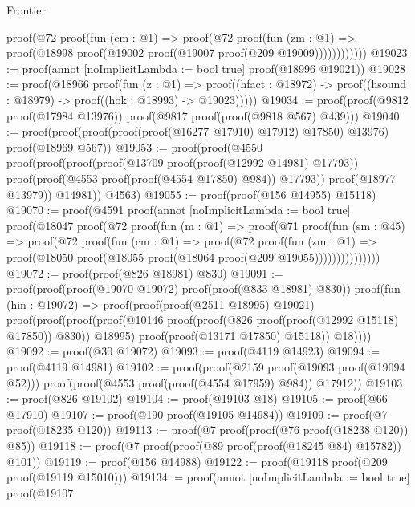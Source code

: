 \begin{lexlean}{Frontier}
\begin{coremodule}
              proof(@72
                  proof(fun (cm : @1) =>
                    proof(@72
                        proof(fun (zm : @1) =>
                          proof(@18998 proof(@19002 proof(@19007 proof(@209 @19009))))))))))))
@19023 := proof(annot [noImplicitLambda := bool true] proof(@18996 @19021))
@19028 := proof(@18966
      proof(fun (z : @1) =>
        proof((hfact : @18972) -> proof((hsound : @18979) -> proof((hok : @18993) -> @19023)))))
@19034 := proof(proof(@9812 proof(@17984 @13976)) proof(@9817 proof(proof(@9818 @567) @439)))
@19040 := proof(proof(proof(proof(proof(@16277 @17910) @17912) @17850) @13976) proof(@18969 @567))
@19053 := proof(proof(@4550
        proof(proof(proof(proof(@13709 proof(proof(@12992 @14981) @17793))
                proof(proof(@4553 proof(proof(@4554 @17850) @984)) @17793))
              proof(@18977 @13979))
            @14981))
      @4563)
@19055 := proof(proof(@156 @14955) @15118)
@19070 := proof(@4591
      proof(annot [noImplicitLambda := bool true]
        proof(@18047
            proof(@72
                proof(fun (m : @1) =>
                  proof(@71
                      proof(fun (sm : @45) =>
                        proof(@72
                            proof(fun (cm : @1) =>
                              proof(@72
                                  proof(fun (zm : @1) =>
                                    proof(@18050
                                        proof(@18055 proof(@18064 proof(@209 @19055)))))))))))))))
@19072 := proof(proof(@826 @18981) @830)
@19091 := proof(proof(proof(@19070 @19072) proof(proof(@833 @18981) @830))
      proof(fun (hin : @19072) =>
        proof(proof(proof(@2511 @18995) @19021)
            proof(proof(proof(proof(@10146
                      proof(proof(@826 proof(proof(@12992 @15118) @17850)) @830))
                    @18995)
                  proof(proof(@13171 @17850) @15118))
                @18))))
@19092 := proof(@30 @19072)
@19093 := proof(@4119 @14923)
@19094 := proof(@4119 @14981)
@19102 := proof(proof(@2159 proof(@19093 proof(@19094 @52)))
      proof(proof(@4553 proof(proof(@4554 @17959) @984)) @17912))
@19103 := proof(@826 @19102)
@19104 := proof(@19103 @18)
@19105 := proof(@66 @17910)
@19107 := proof(@190 proof(@19105 @14984))
@19109 := proof(@7 proof(@18235 @120))
@19113 := proof(@7 proof(proof(@76 proof(@18238 @120)) @85))
@19118 := proof(@7 proof(proof(@89 proof(proof(@18245 @84) @15782)) @101))
@19119 := proof(@156 @14988)
@19122 := proof(@19118 proof(@209 proof(@19119 @15010)))
@19134 := proof(annot [noImplicitLambda := bool true]
    proof(@19107

\end{coremodule}
\end{lexlean}
